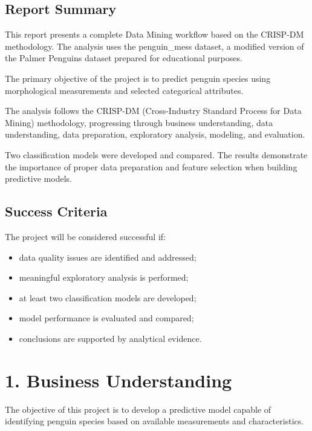 \documentclass[
]{article}
\providecommand{\tightlist}{%
  \setlength{\itemsep}{0pt}\setlength{\parskip}{0pt}}
\begin{document}
\subsection{Report Summary}\label{report-summary}

This report presents a complete Data Mining workflow based on the
CRISP-DM methodology. The analysis uses the penguin\_mess dataset, a
modified version of the Palmer Penguins dataset prepared for educational
purposes.

The primary objective of the project is to predict penguin species using
morphological measurements and selected categorical attributes.

The analysis follows the CRISP-DM (Cross-Industry Standard Process for
Data Mining) methodology, progressing through business understanding,
data understanding, data preparation, exploratory analysis, modeling,
and evaluation.

Two classification models were developed and compared. The results
demonstrate the importance of proper data preparation and feature
selection when building predictive models.

\subsection{Success Criteria}\label{success-criteria}

The project will be considered successful if:

\begin{itemize}
\tightlist
\item
  data quality issues are identified and addressed;
\item
  meaningful exploratory analysis is performed;
\item
  at least two classification models are developed;
\item
  model performance is evaluated and compared;
\item
  conclusions are supported by analytical evidence.
\end{itemize}

\section{1. Business Understanding}\label{business-understanding}

The objective of this project is to develop a predictive model capable
of identifying penguin species based on available measurements and
characteristics.
\end{document}
